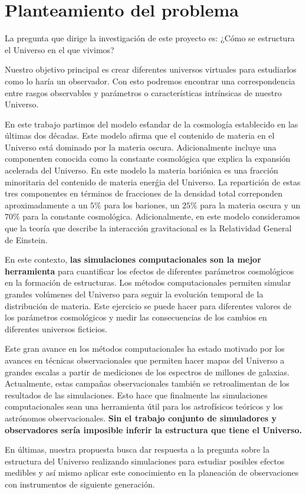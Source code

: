 

\section{Planteamiento del problema}

La pregunta que dirige la investigaci\'on de este proyecto es: ¿Cómo
se estructura el Universo en el que vivimos?

Nuestro objetivo principal es crear diferentes universos virtuales
para estudiarlos como lo har\'ia un observador. Con esto podremos
encontrar una correspondencia entre rasgos observables y
par\'ametros o caracter\'isticas intr\'insicas de nuestro Universo.

En este trabajo partimos del modelo es\'tandar de la cosmolog\'ia
establecido en las \'ultimas dos d\'ecadas. Este modelo afirma que el
contenido de materia en el Universo est\'a dominado por la materia oscura. 
Adicionalmente incluye una componenten conocida como la constante
cosmol\'ogica  que explica la expansi\'on acelerada del Universo. 
En este modelo la materia bari\'onica es una fracci\'on minoritaria
del contenido de materia ener\'gia del Universo. 
La repartici\'on de estas tres componentes en t\'erminos de fracciones
de la densidad total correponden aproximadamente a un $5\%$ para los
bariones, un $25\%$ para la materia oscura y un $70\%$ para la
constante cosmol\'ogica. Adicionalmente, en este modelo consideramos
que la teor\'ia que describe la interacci\'on gravitacional es la
Relatividad General de Einstein. 

En este contexto, {\bf las simulaciones computacionales son la mejor
herramienta} para cuantificar los efectos de diferentes par\'ametros
cosmol\'ogicos en la formaci\'on de estructuras. 
Los  m\'etodos computacionales permiten simular grandes vol\'umenes
del Universo para seguir la evoluci\'on temporal de la distribuci\'on
de materia. 
Este ejercicio se puede hacer para diferentes valores de los
par\'ametros cosmol\'ogicos y  medir las consecuencias de los cambios
en diferentes universos ficticios.  


Este gran avance en los m\'etodos computacionales ha estado motivado por
los avances en t\'ecnicas observacionales que permiten hacer mapas del
Universo a grandes escalas a partir de mediciones de los espectros de
millones de galaxias.   
Actualmente, estas campa\~nas observacionales tambi\'en se
retroalimentan de los resultados de las simulaciones. 
Esto hace que finalmente las simulaciones computacionales sean una
herramienta \'util para los astrof\'isicos te\'oricos y los
astr\'onomos observacionales. {\bf Sin el trabajo conjunto de
  simuladores y observadores ser\'ia imposible inferir la estructura
  que tiene el Universo.} 

En \'ultimas, nuestra propuesta busca dar respuesta a la pregunta sobre la
estructura del Universo realizando simulaciones para estudiar posibles
efectos medibles y as\'i mismo aplicar este conocimiento en la
planeaci\'on de observaciones con instrumentos de siguiente
generaci\'on.  

